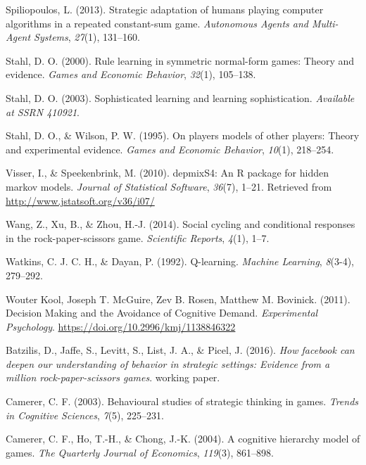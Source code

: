 \documentclass[man,floatsintext]{apa6}
\begin{document}
\leavevmode\hypertarget{ref-spiliopoulos2013strategic}{}%
Spiliopoulos, L. (2013). Strategic adaptation of humans playing computer algorithms in a repeated constant-sum game. \emph{Autonomous Agents and Multi-Agent Systems}, \emph{27}(1), 131--160.

\leavevmode\hypertarget{ref-stahl2000rule}{}%
Stahl, D. O. (2000). Rule learning in symmetric normal-form games: Theory and evidence. \emph{Games and Economic Behavior}, \emph{32}(1), 105--138.

\leavevmode\hypertarget{ref-stahl2003sophisticated}{}%
Stahl, D. O. (2003). Sophisticated learning and learning sophistication. \emph{Available at SSRN 410921}.

\leavevmode\hypertarget{ref-stahl1995players}{}%
Stahl, D. O., \& Wilson, P. W. (1995). On players models of other players: Theory and experimental evidence. \emph{Games and Economic Behavior}, \emph{10}(1), 218--254.

\leavevmode\hypertarget{ref-R-depmixS4}{}%
Visser, I., \& Speekenbrink, M. (2010). depmixS4: An R package for hidden markov models. \emph{Journal of Statistical Software}, \emph{36}(7), 1--21. Retrieved from \url{http://www.jstatsoft.org/v36/i07/}

\leavevmode\hypertarget{ref-wang2014social}{}%
Wang, Z., Xu, B., \& Zhou, H.-J. (2014). Social cycling and conditional responses in the rock-paper-scissors game. \emph{Scientific Reports}, \emph{4}(1), 1--7.

\leavevmode\hypertarget{ref-watkins1992q}{}%
Watkins, C. J. C. H., \& Dayan, P. (1992). Q-learning. \emph{Machine Learning}, \emph{8}(3-4), 279--292.

\leavevmode\hypertarget{ref-Kool_2011}{}%
Wouter Kool, Joseph T. McGuire, Zev B. Rosen, Matthew M. Bovinick. (2011). Decision Making and the Avoidance of Cognitive Demand. \emph{Experimental Psychology}. \url{https://doi.org/10.2996/kmj/1138846322}

\leavevmode\hypertarget{ref-batzilis}{}%
Batzilis, D., Jaffe, S., Levitt, S., List, J. A., \& Picel, J. (2016). \emph{How facebook can deepen our understanding of behavior in strategic settings: Evidence from a million rock-paper-scissors games}. working paper.

\leavevmode\hypertarget{ref-camerer2003behavioural}{}%
Camerer, C. F. (2003). Behavioural studies of strategic thinking in games. \emph{Trends in Cognitive Sciences}, \emph{7}(5), 225--231.

\leavevmode\hypertarget{ref-camerer2004cognitive}{}%
Camerer, C. F., Ho, T.-H., \& Chong, J.-K. (2004). A cognitive hierarchy model of games. \emph{The Quarterly Journal of Economics}, \emph{119}(3), 861--898.
\end{document}
